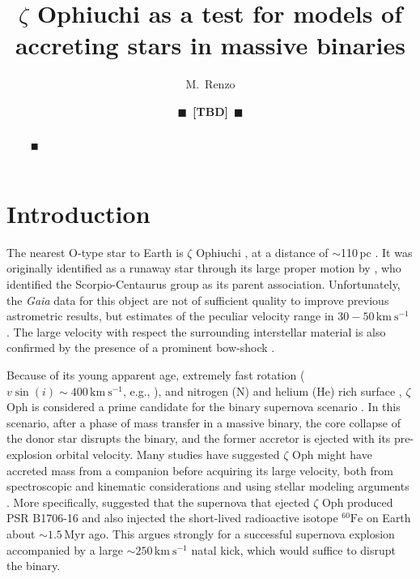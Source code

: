\documentclass[twocolumn,twocolappendix,trackchanges]{aastex63}
\newcommand{\kms}{{\mathrm{km\ s^{-1}}}}
\newcommand{\todo}[1]{{\large $\blacksquare$~\textbf{\color{red}[#1]}}~$\blacksquare$}
\begin{document}
\title{$\zeta$ Ophiuchi as a test for models of accreting stars in
  massive binaries}
\author[0000-0002-6718-9472]{M.~Renzo}

\author{\todo{TBD}}

\begin{abstract}
\centering \todo{TBD}
\end{abstract}

\vspace*{-10pt}


\section{Introduction}
\label{sec:intro}


The nearest O-type star to Earth is $\zeta$ Ophiuchi \citep[spectral
type O9.5{\rm IVnn},][]{sota:14}, at %
a distance of $\sim$110\,pc \citep[e.g.,][and references
therein]{neuhauser:20}. It was originally identified as a runaway star
through its large proper motion by \cite{blaauw:52}, who identified
the Scorpio-Centaurus group as its parent association.  Unfortunately,
the \emph{Gaia} data for this object are not of sufficient quality to
improve previous astrometric results, but estimates of the peculiar
velocity range in $30-50\,\kms$
\citep[e.g.,][]{zehe:18, neuhauser:20}. The
large velocity with respect the surrounding interstellar material is
also confirmed by the presence of a prominent bow-shock
\citep[e.g.,][]{bodensteiner:18}.

Because of its young apparent age, extremely fast rotation
($v\sin(i)\sim 400\,\kms$, e.g., \citealt{zehe:18}),
and nitrogen (N) and helium (He) rich surface \citep[e.g.,][]{blaauw:93,
  villamariz:05, marcolino:09}, $\zeta$ Oph is considered a prime
candidate for the binary supernova scenario \citep{blaauw:61,
  renzo:19walk}. In this scenario, after a phase of mass transfer in a
massive binary, the core collapse of the donor star disrupts the
binary, and the former accretor is ejected with its pre-explosion
orbital velocity. Many studies have suggested $\zeta$ Oph
might have accreted mass from a companion before acquiring its large
velocity, both from spectroscopic and kinematic considerations
\citep[e.g.,][]{blaauw:93, hoogerwerf:00, hoogerwerf:01, tetzlaff:10, neuhauser:20}
and using stellar modeling arguments
\citep[e.g.,][]{vanrensbergen:96}.  More specifically,
\cite{neuhauser:20} suggested that the supernova that ejected $\zeta$
Oph produced PSR B1706-16 and also injected the short-lived
radioactive isotope $^{60}\mathrm{Fe}$ on Earth about $\sim 1.5$\,Myr
ago. This argues strongly for a successful supernova explosion
accompanied by a large $\sim 250\,\kms$ natal kick,
which would suffice to disrupt the binary.
\end{document}
